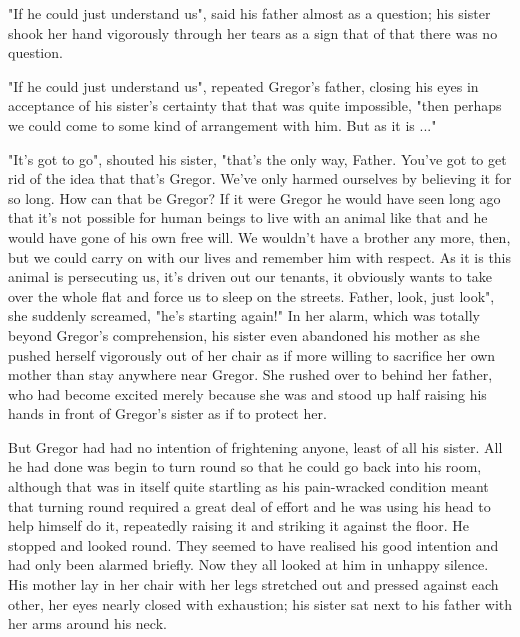 "If he could just understand us", said his father almost as a question; his sister shook her hand vigorously through her tears as a sign that of that there was no question.

"If he could just understand us", repeated Gregor's father, closing his eyes in acceptance of his sister's certainty that that was quite impossible, "then perhaps we could come to some kind of arrangement with him. But as it is ..."

"It's got to go", shouted his sister, "that's the only way, Father. You've got to get rid of the idea that that's Gregor. We've only harmed ourselves by believing it for so long. How can that be Gregor? If it were Gregor he would have seen long ago that it's not possible for human beings to live with an animal like that and he would have gone of his own free will. We wouldn't have a brother any more, then, but we could carry on with our lives and remember him with respect. As it is this animal is persecuting us, it's driven out our tenants, it obviously wants to take over the whole flat and force us to sleep on the streets. Father, look, just look", she suddenly screamed, "he's starting again!"   In her alarm, which was totally beyond Gregor's comprehension, his sister even abandoned his mother as she pushed herself vigorously out of her chair as if more willing to sacrifice her own mother than stay anywhere near Gregor. She rushed over to behind her father, who had become excited merely because she was and stood up half raising his hands in front of Gregor's sister as if to protect her.

But Gregor had had no intention of frightening anyone, least of all his sister. All he had done was begin to turn round so that he could go back into his room, although that was in itself quite startling as his pain-wracked condition meant that turning round required a great deal of effort and he was using his head to help himself do it, repeatedly raising it and striking it against the floor. He stopped and looked round. They seemed to have realised his good intention and had only been alarmed briefly. Now they all looked at him in unhappy silence. His mother lay in her chair with her legs stretched out and pressed against each other, her eyes nearly closed with exhaustion; his sister sat next to his father with her arms around his neck.

